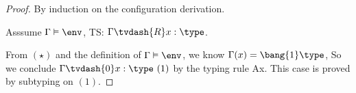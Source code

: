 \begin{proof}
  By induction on the configuration derivation.\\
   

  Asssume $\Gamma \vDash \env$,  TS: $\Gamma \tvdash{R} x: \type $.
  
  From $(\star)$ and the definition of $\Gamma \vDash \env$, we know $\Gamma(x) = \bang{1} \type$,
  So we conclude $\Gamma \tvdash{0} x: \type ~(1)$ by the typing rule Ax. This case is proved by subtyping on $(1)$.


\end{proof}
